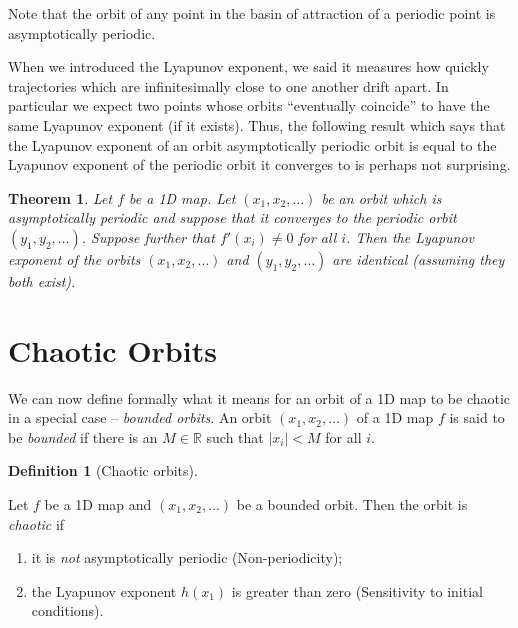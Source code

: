 \documentclass[
  a4paper,
  oneside,
  final]{krantz}
\providecommand{\tightlist}{%
  \setlength{\itemsep}{0pt}\setlength{\parskip}{0pt}}
\newcommand{\R}{\mathbb{R}}
\newtheorem{theorem}{Theorem}[chapter]
\theoremstyle{definition}
\newtheorem{definition}{Definition}[chapter]
\theoremstyle{definition}
\theoremstyle{definition}
\theoremstyle{definition}
\theoremstyle{remark}
\begin{document}
Note that the orbit of any point in the basin of attraction of a periodic point is asymptotically periodic.

When we introduced the Lyapunov exponent, we said it measures how quickly trajectories which are infinitesimally close to one another drift apart. In particular we expect two points whose orbits ``eventually coincide'' to have the same Lyapunov exponent (if it exists). Thus, the following result which says that the Lyapunov exponent of an orbit asymptotically periodic orbit is equal to the Lyapunov exponent of the periodic orbit it converges to is perhaps not surprising.

\begin{theorem}
\protect\hypertarget{thm:asymptociallyperiodicsamelyapunov}{}\label{thm:asymptociallyperiodicsamelyapunov}Let \(f\) be a 1D map. Let \((x_1, x_2, \ldots)\) be an orbit which is asymptotically periodic and suppose that it converges to the periodic orbit \((y_1, y_2, \ldots)\). Suppose further that \(f'(x_i) \ne 0\) for all \(i\). Then the Lyapunov exponent of the orbits \((x_1, x_2, \ldots)\) and \((y_1, y_2, \ldots)\) are identical (assuming they both exist).
\end{theorem}

\hypertarget{chaoticorbits}{%
\section{Chaotic Orbits}\label{chaoticorbits}}

We can now define formally what it means for an orbit of a 1D map to be chaotic in a special case -- \emph{bounded orbits}. An orbit \((x_1, x_2, \ldots)\) of a 1D map \(f\) is said to be \emph{bounded} if there is an \(M \in \R\) such that \(|x_i| < M\) for all \(i\).

\begin{definition}[Chaotic orbits]
\protect\hypertarget{def:defchaoticorbits}{}\label{def:defchaoticorbits}

Let \(f\) be a 1D map and \((x_1, x_2, \ldots)\) be a bounded orbit. Then the orbit is \emph{chaotic} if

\begin{enumerate}
\def\labelenumi{\arabic{enumi}.}
\tightlist
\item
  it is \emph{not} asymptotically periodic (Non-periodicity);
\item
  the Lyapunov exponent \(h(x_1)\) is greater than zero (Sensitivity to initial conditions).
\end{enumerate}

\end{definition}
\end{document}

